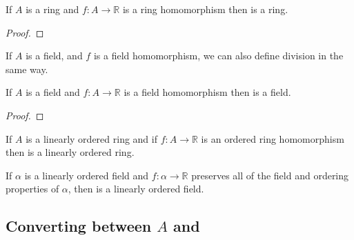 \begin{lemma}
  \label{thm:filteredRing}
  \notready
  If $A$ is a ring and $f : A → ℝ$ is a ring homomorphism then 
  is a ring.
\end{lemma}

\begin{proof}
  \notready
\end{proof}

\begin{definition}
  \label{def:filteredInv}
  If $A$ is a field, and $f$ is a field homomorphism, we can also define
  division in the same way.
\end{definition}

\begin{lemma}
  \label{thm:filteredField}
  \notready
  If $A$ is a field and $f : A → ℝ$ is a field homomorphism then 
  is a field.
\end{lemma}

\begin{proof}
  \notready
\end{proof}

\begin{definition}
  \label{def:filteredCompare}
  \notready
\end{definition}

\begin{lemma}
  \label{thm:filteredOrderedRing}
  \notready
  If $A$ is a linearly ordered ring and if $f : A → ℝ$ is an ordered ring
  homomorphism then  is a linearly ordered ring.
\end{lemma}

\begin{theorem}
  \label{thm:filteredOrderedField}
  \notready
  If $α$ is a linearly ordered field and $f : α → ℝ$ preserves all of the field
  and ordering properties of $α$, then  is a linearly
  ordered field.
\end{theorem}

\subsection{Converting between $A$ and }

